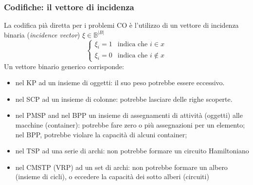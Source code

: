 \documentclass{article}
\begin{document}
\subsubsection{Codifiche: il vettore di incidenza}
La codifica pià diretta per i problemi CO è l'utilizzo di un vettore di incidenza
binaria (\textit{incidence vector}) $\xi\in\mathbb{B}^{|B|}$
\[
    \begin{cases}
        \xi_i=1 & \text{indica che }i\in x\\
        \xi_i=0 & \text{indica che }i\notin x
    \end{cases}
\]
Un vettore binario generico corrisponde:
\begin{itemize}
    \item nel KP ad un insieme di oggetti: il suo peso potrebbe essere eccessivo.
    \item nel SCP ad un insieme di colonne: potrebbe lasciare delle righe scoperte.
    \item nel PMSP and nel BPP un insieme di assegnamenti di attività (oggetti)
    alle macchine (container): 
    potrebbe fare zero o più assegnazioni per un elemento; nel BPP,
    potrebbe violare la capacità di alcuni container;
    \item nel TSP ad una serie di archi: non potrebbe formare un circuito Hamiltoniano
    \item nel CMSTP (VRP) ad un set di archi: non potrebbe formare un albero (insieme di cicli),
    o eccedere la capacità dei sotto alberi (circuiti)
\end{itemize}
\end{document}
